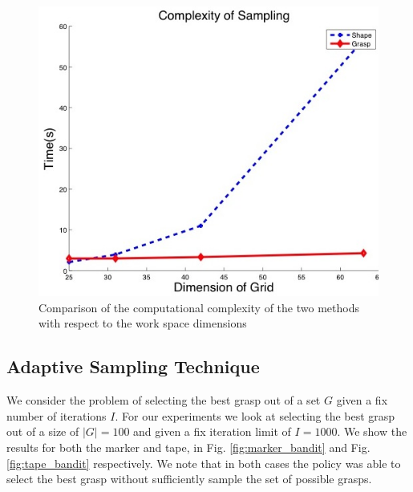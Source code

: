 \documentclass[letterpaper, 10 pt, conference]{ieeeconf}  %
\begin{document}
\begin{figure}[ht!]
\centering
\includegraphics[scale = 0.3]{figures/Slide12.jpg}
\caption{Comparison of the computational complexity of the two methods with respect to the work space dimensions}
\vspace*{-10pt}
\label{fig:speed_dif}
\end{figure}

\subsection{Adaptive Sampling Technique}

We consider the problem of selecting the best grasp out of a set $G$ given a fix number of iterations $I$. For our experiments we look at selecting the best grasp out of a size of $|G| = 100$ and given a fix iteration limit of $I = 1000$. We show the results for both the marker and tape, in Fig. \ref{fig:marker_bandit} and Fig. \ref{fig:tape_bandit} respectively. We note that in both cases the policy was able to select the best grasp without sufficiently sample the set of possible grasps. 

\end{document}
